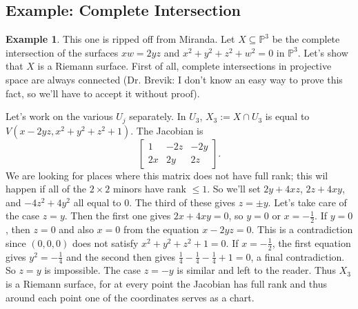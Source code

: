 \documentclass[12pt]{article}
\newcommand{\p}{\mathbb{P}}
\theoremstyle{definition}
\newtheorem{example}[theorem]{Example}
\theoremstyle{remark}
\begin{document}
\subsection{Example: Complete Intersection}
\begin{example}
    This one is ripped off from Miranda. Let $X \subseteq \p^3$ be the complete intersection of the surfaces $xw = 2yz$ and $x^2 + y^2 + z^2 + w^2 = 0$ in $\p^3$. Let's show that $X$ is a Riemann surface. First of all, complete intersections in projective space are always connected (Dr. Brevik: I don't know an easy way to prove this fact, so we'll have to accept it without proof).
    
    Let's work on the various $U_j$ separately. In $U_3$, $X_3 := X \cap U_3$ is equal to $V(x-2yz,x^2+y^2+z^2+1)$. The Jacobian is 
    \[
        \begin{bmatrix}
            1 & -2z & -2y \\
            2x & 2y & 2z
        \end{bmatrix}.
    \]
    We are looking for places where this matrix does not have full rank; this wil happen if all of the $2 \times 2$ minors have rank $\leq 1$. So we'll set $2y + 4xz$, $2z + 4xy$, and $-4z^2 + 4y^2$ all equal to $0$. The third of these gives $z = \pm y$. Let's take care of the case $z = y$. Then the first one gives $2x + 4xy = 0$, so $y = 0$ or $x = -\frac{1}{2}$. If $y = 0$, then $z = 0$ and also $x = 0$ from the equation $x - 2yz = 0$. This is a contradiction since $(0,0,0)$ does not satisfy $x^2 + y^2 + z^2 + 1 = 0$. If $x = -\frac{1}{2}$, the first equation gives $y^2 = -\frac{1}{4}$ and the second then gives $\frac{1}{4} - \frac{1}{4} - \frac{1}{4} + 1 = 0$, a final contradiction. So $z = y$ is impossible. The case $z = -y$ is similar and left to the reader. Thus $X_3$ is a Riemann surface, for at every point the Jacobian has full rank and thus around each point one of the coordinates serves as a chart.
\end{example}
\end{document}
